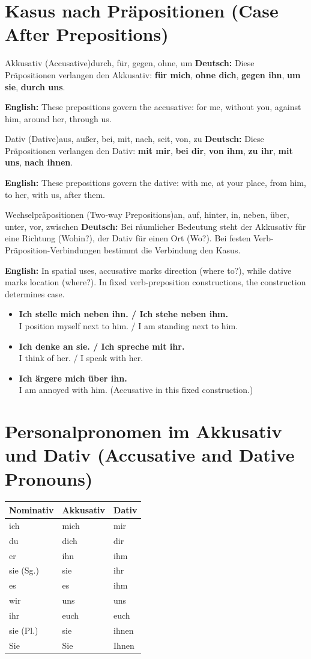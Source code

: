 \documentclass[a4paper,11pt]{article}
\newcommand{\GermanText}[1]{\textbf{Deutsch: }#1\par}
\newcommand{\EnglishText}[1]{{\small\color{SoftGray}\textbf{English: }#1\par}}
\newcommand{\ExampleItem}[2]{\item \textbf{#1}\\{\small\color{SoftGray}#2}}
\begin{document}
\section{Kasus nach Präpositionen (Case After Prepositions)}
\begin{grammarentry}{Akkusativ (Accusative)}{durch, für, gegen, ohne, um}
\GermanText{Diese Präpositionen verlangen den Akkusativ: \textbf{für mich}, \textbf{ohne dich}, \textbf{gegen ihn}, \textbf{um sie}, \textbf{durch uns}.}
\EnglishText{These prepositions govern the accusative: for me, without you, against him, around her, through us.}
\end{grammarentry}
\begin{grammarentry}{Dativ (Dative)}{aus, außer, bei, mit, nach, seit, von, zu}
\GermanText{Diese Präpositionen verlangen den Dativ: \textbf{mit mir}, \textbf{bei dir}, \textbf{von ihm}, \textbf{zu ihr}, \textbf{mit uns}, \textbf{nach ihnen}.}
\EnglishText{These prepositions govern the dative: with me, at your place, from him, to her, with us, after them.}
\end{grammarentry}
\begin{grammarentry}{Wechselpräpositionen (Two-way Prepositions)}{an, auf, hinter, in, neben, über, unter, vor, zwischen}
\GermanText{Bei räumlicher Bedeutung steht der Akkusativ für eine Richtung (Wohin?), der Dativ für einen Ort (Wo?). Bei festen Verb-Präposition-Verbindungen bestimmt die Verbindung den Kasus.}
\EnglishText{In spatial uses, accusative marks direction (where to?), while dative marks location (where?). In fixed verb-preposition constructions, the construction determines case.}
\end{grammarentry}
\begin{exbox}\begin{itemize}
\ExampleItem{Ich stelle mich neben ihn. / Ich stehe neben ihm.}{I position myself next to him. / I am standing next to him.}
\ExampleItem{Ich denke an sie. / Ich spreche mit ihr.}{I think of her. / I speak with her.}
\ExampleItem{Ich ärgere mich über ihn.}{I am annoyed with him. (Accusative in this fixed construction.)}
\end{itemize}\end{exbox}
\section{Personalpronomen im Akkusativ und Dativ (Accusative and Dative Pronouns)}
\begin{exbox}\begin{center}
\begin{tabular}{lll}\textbf{Nominativ}&\textbf{Akkusativ}&\textbf{Dativ}\\\hline
ich&mich&mir\\du&dich&dir\\er&ihn&ihm\\sie (Sg.)&sie&ihr\\es&es&ihm\\wir&uns&uns\\ihr&euch&euch\\sie (Pl.)&sie&ihnen\\Sie&Sie&Ihnen
\end{tabular}\end{center}\end{exbox}
\end{document}
